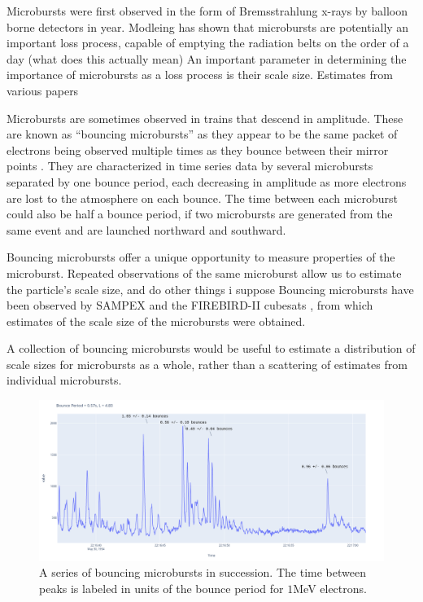 \documentclass[draft]{agujournal2019}
\begin{document}
Microbursts were first observed in the form of Bremsstrahlung x-rays by balloon borne detectors \cite{balloon_burst_first} in year.
Modleing has shown that microbursts are potentially an important loss process, capable of emptying the radiation belts on the order of a day \cite{micro_loss} (what does this actually mean)
An important parameter in determining the importance of microbursts as a loss process is their scale size. 
Estimates from various papers
 

Microbursts are sometimes observed in trains that descend in amplitude.
These are known as ``bouncing microbursts'' as they appear to be the same packet of electrons being observed multiple times as they bounce between their mirror points \cite{Blake96}. 
They are characterized in time series data by several microbursts separated by one bounce period, each decreasing in amplitude as more electrons are lost to the atmosphere on each bounce.
The time between each microburst could also be half a bounce period, if two microbursts are generated from the same event and are launched northward and southward.  

Bouncing microbursts offer a unique opportunity to measure properties of the microburst. 
Repeated observations of the same microburst allow us to estimate the particle's scale size, and do other things i suppose
Bouncing microbursts have been observed by SAMPEX \cite{Blake96} and the FIREBIRD-II cubesats \cite{fire_bounce}, from which estimates of the scale size of the microbursts were obtained. 

A collection of bouncing microbursts would be useful to estimate a distribution of scale sizes for microbursts as a whole, rather than a scattering of estimates from individual microbursts.




\begin{figure}
\includegraphics[width=\textwidth]{case_study.png}
\caption{A series of bouncing microbursts in succession. The time between peaks is labeled in units of the bounce period for $1$MeV electrons. }
\end{figure}
\end{document}
